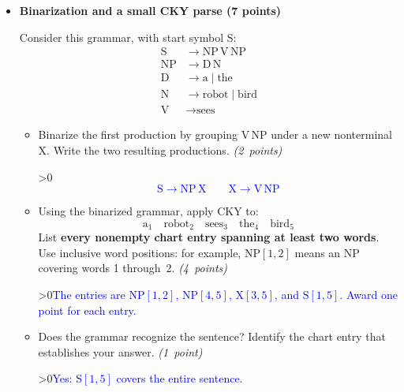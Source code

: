 \documentclass[12pt]{article}
\newcounter{showsolution}
\newcommand{\solution}[2]{\ifnum\value{showsolution}>0{\textcolor{blue}{#1}}\else{#2}\fi}
\begin{document}
\begin{itemize}
\newpage



\item[4.] \textbf{Binarization and a small CKY parse (7 points)}

Consider this grammar, with start symbol $\mathrm{S}$:
\[
\begin{aligned}
  \mathrm{S}  &\rightarrow \mathrm{NP}\,\mathrm{V}\,\mathrm{NP} \\
  \mathrm{NP} &\rightarrow \mathrm{D}\,\mathrm{N} \\
  \mathrm{D}  &\rightarrow \text{a} \mid \text{the} \\
  \mathrm{N}  &\rightarrow \text{robot} \mid \text{bird} \\
  \mathrm{V}  &\rightarrow \text{sees}
\end{aligned}
\]

\begin{itemize}
\item[a.] Binarize the first production by grouping $\mathrm{V}\,\mathrm{NP}$ under a new
nonterminal $\mathrm{X}$. Write the two resulting productions.
\hfill{\em (2~points)}

\solution{
\[
  \mathrm{S} \rightarrow \mathrm{NP}\,\mathrm{X}
  \qquad
  \mathrm{X} \rightarrow \mathrm{V}\,\mathrm{NP}
\]
}{\vspace{0.45in}}

\item[b.] Using the binarized grammar, apply CKY to:
\[
  \text{a}_{1}\quad \text{robot}_{2}\quad \text{sees}_{3}
  \quad \text{the}_{4}\quad \text{bird}_{5}
\]
List \textbf{every nonempty chart entry spanning at least two words}.
Use inclusive word positions: for example, $\mathrm{NP}[1,2]$ means an NP
covering words 1 through~2. \phantom{xxxxxxxxxxx} \hfill{\em (4~points)}

\solution{The entries are $\mathrm{NP}[1,2]$, $\mathrm{NP}[4,5]$,
$\mathrm{X}[3,5]$, and $\mathrm{S}[1,5]$. Award one point for each entry.}{\vspace{0.65in}}


\item[c.] Does the grammar recognize the sentence? Identify the chart
entry that establishes your answer. \hfill{\em (1~point)}

\solution{Yes: $\mathrm{S}[1,5]$ covers the entire sentence.}{\vspace{0.4in}}

\end{itemize}
\end{itemize}
\end{document}
